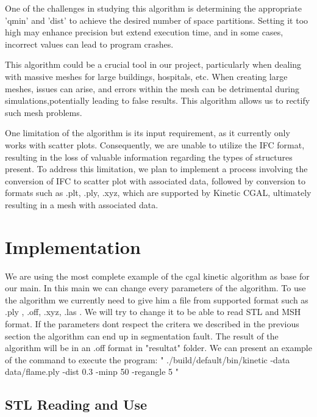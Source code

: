 \documentclass{article}
\begin{document}
  One of the challenges in studying this algorithm is determining the appropriate 'qmin' and 'dist' to achieve the desired number of space partitions.
  Setting it too high may enhance precision but extend execution time, and in some cases, incorrect values can lead to program crashes.

This algorithm could be a crucial tool in our project, particularly when dealing with massive meshes for large buildings,
hospitals, etc. When creating large meshes, issues can arise, and errors within the mesh can be detrimental during simulations,potentially leading to false results. 
This algorithm allows us to rectify such mesh problems.

One limitation of the algorithm is its input requirement, as it currently only works with scatter plots. Consequently, we are unable to utilize the IFC format, 
resulting in the loss of valuable information regarding the types of structures present. To address this limitation, 
we plan to implement a process involving the conversion of IFC to scatter plot with associated data, followed by conversion to formats such as .plt, .ply, .xyz,
which are supported by Kinetic CGAL, ultimately resulting in a mesh with associated data.


\section{Implementation}

We are using the most complete example of the cgal kinetic algorithm as base for our main. In this main we can change every parameters of the algorithm.
\newline
To use the algorithm we currently need to give him a file from supported format such as .ply , .off, .xyz, .las .
We will try to change it to be able to read STL and MSH format.
If the parameters dont respect the critera we described in the previous section the algorithm can end up in segmentation fault.
The result of the algorithm will be in an .off format in "resultat" folder.
\newline
We can present an example of the command to execute the program:
\newline
" ./build/default/bin/kinetic -data data/flame.ply -dist 0.3 -minp 50 -regangle 5 "
\newline


\subsection{STL Reading and Use}
\end{document}

